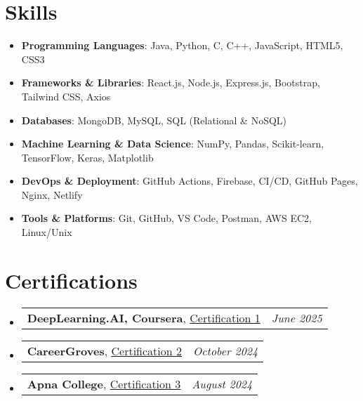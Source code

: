 \documentclass[a4paper,11pt]{article}
\makeatletter
\newcommand{\resumeItem}[2]{
  \item{
    \textbf{#1}{\hspace{0.5mm}#2 \vspace{-0.5mm}}
  }
}
\newcommand{\resumePOR}[3]{
\vspace{0.5mm}\item
    \begin{tabular*}{0.97\textwidth}[t]{l@{\extracolsep{\fill}}r}
        \textbf{#1}\hspace{0.3mm}#2 & \textit{\small{#3}} 
    \end{tabular*}
    \vspace{-2mm}
}
\newcommand{\resumeSubItem}[2]{\resumeItem{#1}{#2}\vspace{-4pt}}
\newcommand{\resumeSubHeadingListStart}{\begin{itemize}[leftmargin=*,labelsep=1mm]}
\newcommand{\resumeHeadingSkillStart}{\begin{itemize}[leftmargin=*,itemsep=1.7mm, rightmargin=2ex]}
\newcommand{\resumeSubHeadingListEnd}{\end{itemize}\vspace{2mm}}
\newcommand{\resumeHeadingSkillEnd}{\end{itemize}\vspace{-2mm}}
\makeatother
\begin{document}
\section{\textbf{Skills}}
\vspace{-0.4mm}
\resumeHeadingSkillStart
  \resumeSubItem{Programming Languages}
    {: Java, Python, C, C++, JavaScript, HTML5, CSS3}
  \resumeSubItem{Frameworks \& Libraries}
    {: React.js, Node.js, Express.js, Bootstrap, Tailwind CSS, Axios}
  \resumeSubItem{Databases}
    {: MongoDB, MySQL, SQL (Relational \& NoSQL)}
  \resumeSubItem{Machine Learning \& Data Science}
    {: NumPy, Pandas, Scikit-learn, TensorFlow, Keras, Matplotlib}
  \resumeSubItem{DevOps \& Deployment}
    {: GitHub Actions, Firebase, CI/CD, GitHub Pages, Nginx, Netlify}
  \resumeSubItem{Tools \& Platforms}
    {: Git, GitHub, VS Code, Postman, AWS EC2, Linux/Unix}
\resumeHeadingSkillEnd
\vspace{-2mm}

\section{\textbf{Certifications}}
\vspace{-0.4mm}
\resumeSubHeadingListStart
\resumePOR
    {DeepLearning.AI, Coursera} %
    {, \href{https://www.coursera.org/account/accomplishments/verify/FLZVCUV6GMU4}{Certification 1}} %
    {June 2025} %
\resumePOR
    {CareerGroves} %
    {, \href{https://www.linkedin.com/in/anurag-verma-18645b280/details/certifications/}{Certification 2}} %
    {October 2024} %
\resumePOR
    {Apna College} %
    {, \href{https://mycourse.app/tQxZ1otn6YDG3TWQA}{Certification 3}} %
    {August 2024} %

\resumeSubHeadingListEnd

\vspace{-6mm}
\end{document}
